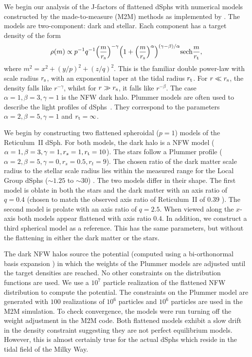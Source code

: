 \documentclass[prd,twocolumn,showpacs,preprintnumbers,superscriptaddress,nofootinbib,amsmath,amssymb,nobalancelastpage]{revtex4}
\def\rs{r_{\rm s}}
\def\rt{r_{\rm t}}
\begin{document}
We begin our analysis of the J-factors of flattened dSphs with numerical models
constructed by the made-to-measure (M2M) methods \citep{Sy96} as implemented
by \citet{De09}. The models are two-component: dark and stellar. Each
component has a target density of the form
%
\begin{equation}
\rho (m)\propto p^{-1}q^{-1}
\Big(\frac{m}{\rs}\Big)^{-\gamma}\Big(1+\Big(\frac{m}{\rs}\Big)^{\alpha}\Big)^{(\gamma-\beta)/\alpha}\mathrm{sech}\frac{m}{\rt},
\label{abgmodel}
\end{equation}
%
where $m^2=x^2+(y/p)^2+(z/q)^2$. This is the familiar
double power-law with scale radius $\rs$, with an exponential taper at
the tidal radius $\rt$. For $r \ll \rs$, the density falls like
$r^{-\gamma}$, whilst for $r \gg \rs$, it falls like $r^{-\beta}$.
The case $\alpha =1, \beta =3, \gamma=1$ is the NFW dark halo.
Plummer models are often used to describe the light profiles of
dSphs~\citep[see e.g.,][]{Ir95, Ag12b}. They correspond to the
parameters $\alpha =2, \beta =5, \gamma=1$ and $\rt = \infty$.

We begin by constructing two flattened spheroidal ($p=1$) models of the Reticulum~II
dSph. For both models, the dark halo is a NFW model
($\alpha=1,\beta=3,\gamma=1,r_s=1,\rt=10$). The stars follow a Plummer
profile ($\alpha=2,\beta=5,\gamma=0,r_s=0.5,r_t=9$). The chosen ratio of the dark matter scale radius to the stellar scale radius lies within the measured range for the Local Group dSphs ($\sim1.25$ to $\sim30$) \citep{Amorisco2012}. The two models
differ in their shape. The first model is oblate in both the stars and
the dark matter with an axis ratio of $q=0.4$ (chosen to match the observed axis ratio of Reticulum~II of $0.39$ \cite{Ko15}). The second model is
prolate with an axis ratio of $q=2.5$. When viewed along the
$x$-axis both models appear flattened with axis ratio $0.4$.  In
addition, we construct a third spherical model as a reference. This
has the same parameters, but without the flattening in either the dark
matter or the stars.

The dark NFW halos source the potential (computed using a bi-orthonormal basis expansion \cite{De09}) in which the weights of the
Plummer models are adjusted until the target densities are reached. No
other constraints on the distribution functions are used. We use a
$10^7$ particle realization of the flattened NFW distribution to
compute the potential. The constraints on the Plummer model are
generated with $100$ realizations of $10^6$ particles and $10^6$
particles are used in the M2M simulation. To check convergence, the
models were run turning off the weight adjustment in the M2M
code. Both flattened models exhibit a slow drift in the density
constraint suggesting they are not perfect equilibrium
models. However, this is almost certainly true for the actual dSphs
which reside in the tidal field of the Milky Way.
\end{document}

